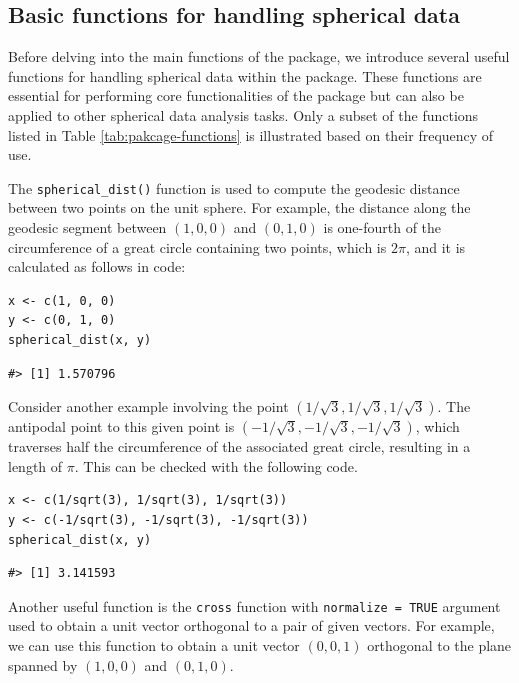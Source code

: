 \subsection*{Basic functions for handling spherical data}\label{basic-functions-for-handling-spherical-data}

Before delving into the main functions of the package, we introduce several useful functions for handling spherical data within the package. These functions are essential for performing core functionalities of the package but can also be applied to other spherical data analysis tasks. Only a subset of the functions listed in Table \ref{tab:pakcage-functions} is illustrated based on their frequency of use.

The \texttt{spherical\_dist()} function is used to compute the geodesic distance between two points on the unit sphere. For example, the distance along the geodesic segment between \((1,0,0)\) and \((0,1,0)\) is one-fourth of the circumference of a great circle containing two points, which is \(2\pi\), and it is calculated as follows in code:

\begin{verbatim}
x <- c(1, 0, 0)
y <- c(0, 1, 0)
spherical_dist(x, y)
\end{verbatim}

\begin{verbatim}
#> [1] 1.570796
\end{verbatim}

Consider another example involving the point \((1/\sqrt{3}, 1/\sqrt{3}, 1/\sqrt{3})\). The antipodal point to this given point is \((-1/\sqrt{3}, -1/\sqrt{3}, -1/\sqrt{3})\), which traverses half the circumference of the associated great circle, resulting in a length of \(\pi\). This can be checked with the following code.

\begin{verbatim}
x <- c(1/sqrt(3), 1/sqrt(3), 1/sqrt(3))
y <- c(-1/sqrt(3), -1/sqrt(3), -1/sqrt(3))
spherical_dist(x, y)
\end{verbatim}

\begin{verbatim}
#> [1] 3.141593
\end{verbatim}

Another useful function is the \texttt{cross} function with \texttt{normalize\ =\ TRUE} argument used to obtain a unit vector orthogonal to a pair of given vectors. For example, we can use this function to obtain a unit vector \((0,0,1)\) orthogonal to the plane spanned by \((1,0,0)\) and \((0,1,0)\).

